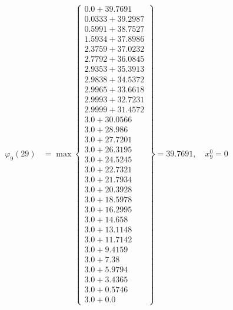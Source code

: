 \documentclass{article}
\begin{document}
\begin{align*}
  
\varphi_{9}(29) &= \max \left\{ \begin{array}{c}
0.0 + 39.7691 \\
 0.0333 + 39.2987 \\
 0.5991 + 38.7527 \\
 1.5934 + 37.8986 \\
 2.3759 + 37.0232 \\
 2.7792 + 36.0845 \\
 2.9353 + 35.3913 \\
 2.9838 + 34.5372 \\
 2.9965 + 33.6618 \\
 2.9993 + 32.7231 \\
 2.9999 + 31.4572 \\
 3.0 + 30.0566 \\
 3.0 + 28.986 \\
 3.0 + 27.7201 \\
 3.0 + 26.3195 \\
 3.0 + 24.5245 \\
 3.0 + 22.7321 \\
 3.0 + 21.7934 \\
 3.0 + 20.3928 \\
 3.0 + 18.5978 \\
 3.0 + 16.2995 \\
 3.0 + 14.658 \\
 3.0 + 13.1148 \\
 3.0 + 11.7142 \\
 3.0 + 9.4159 \\
 3.0 + 7.38 \\
 3.0 + 5.9794 \\
 3.0 + 3.4365 \\
 3.0 + 0.5746 \\
 3.0 + 0.0
\end{array} \right\}=39.7691,\quad x_{9}^0=0\\
  
  
  

\end{align*}
\end{document}
